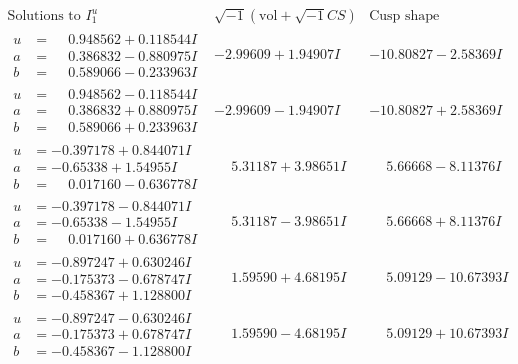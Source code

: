 \documentclass[1p]{elsarticle_modified}
\theoremstyle{definition}
\newcommand{\I}{\sqrt{-1}}
\begin{document}
$$\begin{array}{c|c|c}  
\text{Solutions to }I^u_{1}& \I (\text{vol} + \sqrt{-1}CS) & \text{Cusp shape}\\
 \hline 
\begin{aligned}
u &= \phantom{-}0.948562 + 0.118544 I \\
a &= \phantom{-}0.386832 - 0.880975 I \\
b &= \phantom{-}0.589066 - 0.233963 I\end{aligned}
 & -2.99609 + 1.94907 I & -10.80827 - 2.58369 I \\ \hline\begin{aligned}
u &= \phantom{-}0.948562 - 0.118544 I \\
a &= \phantom{-}0.386832 + 0.880975 I \\
b &= \phantom{-}0.589066 + 0.233963 I\end{aligned}
 & -2.99609 - 1.94907 I & -10.80827 + 2.58369 I \\ \hline\begin{aligned}
u &= -0.397178 + 0.844071 I \\
a &= -0.65338 + 1.54955 I \\
b &= \phantom{-}0.017160 - 0.636778 I\end{aligned}
 & \phantom{-}5.31187 + 3.98651 I & \phantom{-}5.66668 - 8.11376 I \\ \hline\begin{aligned}
u &= -0.397178 - 0.844071 I \\
a &= -0.65338 - 1.54955 I \\
b &= \phantom{-}0.017160 + 0.636778 I\end{aligned}
 & \phantom{-}5.31187 - 3.98651 I & \phantom{-}5.66668 + 8.11376 I \\ \hline\begin{aligned}
u &= -0.897247 + 0.630246 I \\
a &= -0.175373 - 0.678747 I \\
b &= -0.458367 + 1.128800 I\end{aligned}
 & \phantom{-}1.59590 + 4.68195 I & \phantom{-}5.09129 - 10.67393 I \\ \hline\begin{aligned}
u &= -0.897247 - 0.630246 I \\
a &= -0.175373 + 0.678747 I \\
b &= -0.458367 - 1.128800 I\end{aligned}
 & \phantom{-}1.59590 - 4.68195 I & \phantom{-}5.09129 + 10.67393 I \\ \hline\begin{aligned}

\end{aligned}
\end{array}$$
\end{document}
